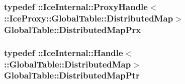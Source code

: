 \label{namespace_global_table_a110ac4602b8f6c72aa866923747317e3}
\hypertarget{namespace_global_table_a54672ca2efff5152d9759b4eb9957676}{
\subsubsection[{DistributedMapPrx}]{\setlength{\rightskip}{0pt plus 5cm}typedef ::IceInternal::ProxyHandle$<$ ::{\bf IceProxy::GlobalTable::DistributedMap}$>$ {\bf GlobalTable::DistributedMapPrx}}}
\label{namespace_global_table_a54672ca2efff5152d9759b4eb9957676}
\hypertarget{namespace_global_table_a37c83cf33bd6e59c8b648a60e1309e5b}{
\subsubsection[{DistributedMapPtr}]{\setlength{\rightskip}{0pt plus 5cm}typedef ::IceInternal::Handle$<$ ::{\bf GlobalTable::DistributedMap}$>$ {\bf GlobalTable::DistributedMapPtr}}}
\label{namespace_global_table_a37c83cf33bd6e59c8b648a60e1309e5b}



